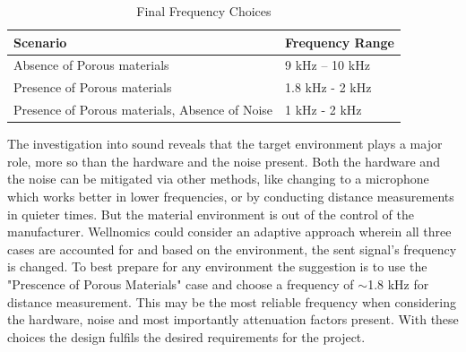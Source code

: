 \begin{table}[H]
\captionsetup{singlelinecheck = false, format= hang, justification=raggedright, font=footnotesize, labelsep=space}
\caption{Final Frequency Choices}
\begin{adjustbox}{max width=\textwidth}
\begin{tabular}{p{7.95cm}p{7.95cm}}
\hline
\multicolumn{1}{|p{7.95cm}}{Scenario } & 
\multicolumn{1}{|p{7.95cm}|}{Frequency Range} \\ 
\hline
\multicolumn{1}{|p{7.95cm}}{Absence of Porous materials } & 
\multicolumn{1}{|p{7.95cm}|}{9 kHz – 10 kHz} \\ 
\hline
\multicolumn{1}{|p{7.95cm}}{Presence of Porous materials } & 
\multicolumn{1}{|p{7.95cm}|}{1.8 kHz - 2 kHz} \\ 
\hline
\multicolumn{1}{|p{7.95cm}}{Presence of Porous materials, Absence of Noise } & 
\multicolumn{1}{|p{7.95cm}|}{1 kHz - 2 kHz} \\ 
\hline
\end{tabular}
\end{adjustbox}
\label{tab:Final choice}
\end{table}

The investigation into sound reveals that the target environment plays a major role, more so than the hardware and the noise present. Both the hardware and the noise can be mitigated via other methods, like changing to a microphone which works better in lower frequencies, or by conducting distance measurements in quieter times. But the material environment is out of the control of the manufacturer. Wellnomics could consider an adaptive approach wherein all three cases are accounted for and based on the environment, the sent signal's frequency is changed. To best prepare for any environment the suggestion is to use the "Prescence of Porous Materials" case and choose a frequency of $\sim$1.8 kHz for distance measurement. This may be the most reliable frequency when considering the hardware, noise and most importantly attenuation factors present. With these choices the design fulfils the desired requirements for the project. \\



